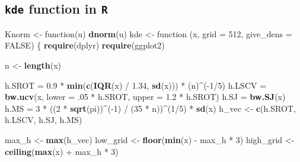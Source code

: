 \documentclass[]{article}
\newenvironment{Shaded}{\begin{snugshade}}{\end{snugshade}}
\newcommand{\KeywordTok}[1]{\textcolor[rgb]{0.13,0.29,0.53}{\textbf{{#1}}}}
\newcommand{\DataTypeTok}[1]{\textcolor[rgb]{0.13,0.29,0.53}{{#1}}}
\newcommand{\DecValTok}[1]{\textcolor[rgb]{0.00,0.00,0.81}{{#1}}}
\newcommand{\FloatTok}[1]{\textcolor[rgb]{0.00,0.00,0.81}{{#1}}}
\newcommand{\StringTok}[1]{\textcolor[rgb]{0.31,0.60,0.02}{{#1}}}
\newcommand{\OtherTok}[1]{\textcolor[rgb]{0.56,0.35,0.01}{{#1}}}
\newcommand{\NormalTok}[1]{{#1}}
\begin{document}
\subsection{\texorpdfstring{\texttt{kde} function in
\texttt{R}}{kde function in R}}\label{kde-function-in-r}

\begin{Shaded}
\begin{Highlighting}[]
\NormalTok{Knorm <-}\StringTok{ }\NormalTok{function(u) }\KeywordTok{dnorm}\NormalTok{(u)}
\NormalTok{kde <-}\StringTok{ }\NormalTok{function (x, }\DataTypeTok{grid =} \DecValTok{512}\NormalTok{, }\DataTypeTok{give_dens =} \OtherTok{FALSE}\NormalTok{) }
\NormalTok{\{}
    \KeywordTok{require}\NormalTok{(dplyr)}
    \KeywordTok{require}\NormalTok{(ggplot2)}
    
    \NormalTok{n <-}\StringTok{ }\KeywordTok{length}\NormalTok{(x)}
    
    \NormalTok{h.SROT =}\StringTok{ }\FloatTok{0.9} \NormalTok{*}\StringTok{ }\KeywordTok{min}\NormalTok{(}\KeywordTok{c}\NormalTok{(}\KeywordTok{IQR}\NormalTok{(x) /}\StringTok{ }\FloatTok{1.34}\NormalTok{, }\KeywordTok{sd}\NormalTok{(x))) *}\StringTok{ }\NormalTok{(n)^(-}\DecValTok{1}\NormalTok{/}\DecValTok{5}\NormalTok{)}
    \NormalTok{h.LSCV =}\StringTok{ }\KeywordTok{bw.ucv}\NormalTok{(x, }\DataTypeTok{lower =} \NormalTok{.}\DecValTok{05} \NormalTok{*}\StringTok{ }\NormalTok{h.SROT, }\DataTypeTok{upper =} \FloatTok{1.2} \NormalTok{*}\StringTok{ }\NormalTok{h.SROT)}
    \NormalTok{h.SJ =}\StringTok{ }\KeywordTok{bw.SJ}\NormalTok{(x)}
    \NormalTok{h.MS =}\StringTok{ }\DecValTok{3} \NormalTok{*}\StringTok{ }\NormalTok{((}\DecValTok{2} \NormalTok{*}\StringTok{ }\KeywordTok{sqrt}\NormalTok{(pi))^(-}\DecValTok{1}\NormalTok{) /}\StringTok{ }\NormalTok{(}\DecValTok{35} \NormalTok{*}\StringTok{ }\NormalTok{n))^(}\DecValTok{1}\NormalTok{/}\DecValTok{5}\NormalTok{) *}\StringTok{ }\KeywordTok{sd}\NormalTok{(x)}
    \NormalTok{h_vec <-}\StringTok{ }\KeywordTok{c}\NormalTok{(h.SROT, h.LSCV, h.SJ, h.MS)}
    
    \NormalTok{max_h <-}\StringTok{ }\KeywordTok{max}\NormalTok{(h_vec)}
    \NormalTok{low_grid <-}\StringTok{ }\KeywordTok{floor}\NormalTok{(}\KeywordTok{min}\NormalTok{(x) -}\StringTok{ }\NormalTok{max_h *}\StringTok{ }\DecValTok{3}\NormalTok{)}
    \NormalTok{high_grid <-}\StringTok{ }\KeywordTok{ceiling}\NormalTok{(}\KeywordTok{max}\NormalTok{(x) +}\StringTok{ }\NormalTok{max_h *}\StringTok{ }\DecValTok{3}\NormalTok{)}
    
    


\end{Highlighting}
\end{Shaded}
\end{document}
